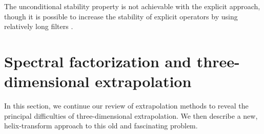 
\par
The unconditional stability property is not achievable with the
explicit approach, though it is possible to increase the stability of
explicit operators by using relatively long filters
\cite[]{GPR36-02-00990114,GEO56-11-17701777}.

\section{Spectral factorization and three-dimensional extrapolation}

In this section, we continue our review of extrapolation methods to
reveal the principal difficulties of three-dimensional extrapolation.
We then describe a new, helix-transform approach to this old and
fascinating problem.

